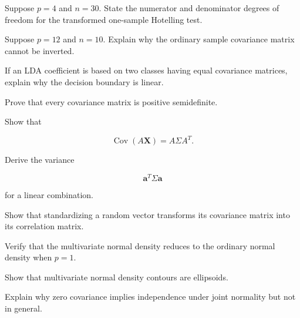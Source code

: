 \begin{exercise}[2]
Suppose \(p=4\) and \(n=30\). State the numerator and denominator degrees
of freedom for the transformed one-sample Hotelling test.
\end{exercise}

\begin{exercise}[2]
Suppose \(p=12\) and \(n=10\). Explain why the ordinary sample covariance
matrix cannot be inverted.
\end{exercise}

\begin{exercise}[2]
If an LDA coefficient is based on two classes having equal covariance
matrices, explain why the decision boundary is linear.
\end{exercise}

\begin{exercise}[3]
Prove that every covariance matrix is positive semidefinite.
\end{exercise}

\begin{exercise}[3]
Show that

\[
\operatorname{Cov}(A\mathbf{X})
=
A\Sigma A^T.
\]
\end{exercise}

\begin{exercise}[3]
Derive the variance

\[
\mathbf{a}^T
\Sigma
\mathbf{a}
\]

for a linear combination.
\end{exercise}

\begin{exercise}[3]
Show that standardizing a random vector transforms its covariance matrix
into its correlation matrix.
\end{exercise}

\begin{exercise}[3]
Verify that the multivariate normal density reduces to the ordinary
normal density when \(p=1\).
\end{exercise}

\begin{exercise}[3]
Show that multivariate normal density contours are ellipsoids.
\end{exercise}

\begin{exercise}[3]
Explain why zero covariance implies independence under joint normality
but not in general.
\end{exercise}

